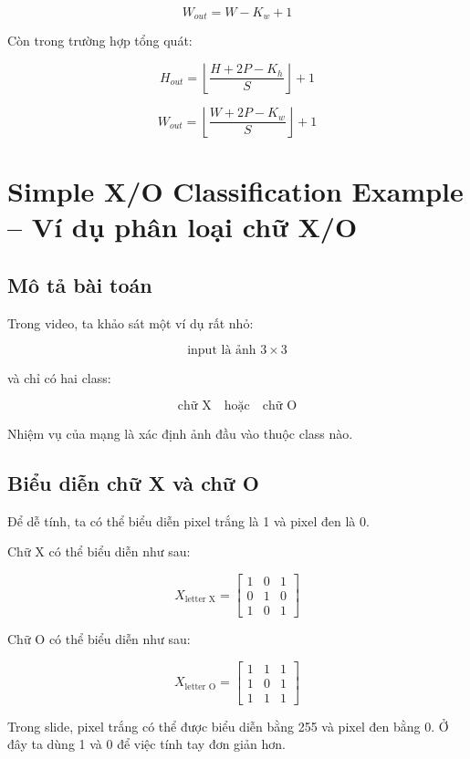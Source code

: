 \[
    W_{out}=W-K_w+1
\]

Còn trong trường hợp tổng quát:

\[
    H_{out}
    =
    \left\lfloor
    \frac{H+2P-K_h}{S}
    \right\rfloor
    +1
\]

\[
    W_{out}
    =
    \left\lfloor
    \frac{W+2P-K_w}{S}
    \right\rfloor
    +1
\]

\section{Simple X/O Classification Example -- Ví dụ phân loại chữ X/O}

\subsection{Mô tả bài toán}

Trong video, ta khảo sát một ví dụ rất nhỏ:

\[
    \text{input là ảnh } 3\times3
\]

và chỉ có hai class:

\[
    \text{chữ X}
    \quad \text{hoặc} \quad
    \text{chữ O}
\]

Nhiệm vụ của mạng là xác định ảnh đầu vào thuộc class nào.

\subsection{Biểu diễn chữ X và chữ O}

Để dễ tính, ta có thể biểu diễn pixel trắng là 1 và pixel đen là 0.

Chữ X có thể biểu diễn như sau:

\[
    X_{\text{letter X}}
    =
    \begin{bmatrix}
    1 & 0 & 1\\
    0 & 1 & 0\\
    1 & 0 & 1
    \end{bmatrix}
\]

Chữ O có thể biểu diễn như sau:

\[
    X_{\text{letter O}}
    =
    \begin{bmatrix}
    1 & 1 & 1\\
    1 & 0 & 1\\
    1 & 1 & 1
    \end{bmatrix}
\]

\begin{luuy}
Trong slide, pixel trắng có thể được biểu diễn bằng 255 và pixel đen bằng 0. Ở đây ta dùng 1 và 0 để việc tính tay đơn giản hơn.
\end{luuy}

